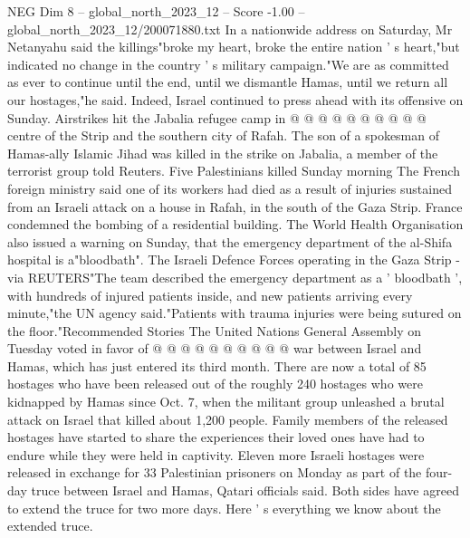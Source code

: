 \begin{textsample}{NEG Dim 8 – global\_north\_2023\_12 – Score -1.00 – global\_north\_2023\_12/200071880.txt}
In a nationwide address on Saturday, Mr Netanyahu said the killings"broke my heart, broke the entire nation ' s heart,"but indicated no change in the country ' s military campaign."We are as committed as ever to continue until the end, until we dismantle Hamas, until we return all our hostages,"he said.
Indeed, Israel continued to press ahead with its offensive on Sunday.
Airstrikes hit the Jabalia refugee camp in @ @ @ @ @ @ @ @ @ @ centre of the Strip and the southern city of Rafah.
The son of a spokesman of Hamas-ally Islamic Jihad was killed in the strike on Jabalia, a member of the terrorist group told Reuters.
Five Palestinians killed Sunday morning The French foreign ministry said one of its workers had died as a result of injuries sustained from an Israeli attack on a house in Rafah, in the south of the Gaza Strip.
France condemned the bombing of a residential building.
The World Health Organisation also issued a warning on Sunday, that the emergency department of the al-Shifa hospital is a"bloodbath".
The Israeli Defence Forces operating in the Gaza Strip - via REUTERS"The team described the emergency department as a ' bloodbath ', with hundreds of injured patients inside, and new patients arriving every minute,"the UN agency said."Patients with trauma injuries were being sutured on the floor."Recommended Stories The United Nations General Assembly on Tuesday voted in favor of @ @ @ @ @ @ @ @ @ @ war between Israel and Hamas, which has just entered its third month.
There are now a total of 85 hostages who have been released out of the roughly 240 hostages who were kidnapped by Hamas since Oct. 7, when the militant group unleashed a brutal attack on Israel that killed about 1,200 people.
Family members of the released hostages have started to share the experiences their loved ones have had to endure while they were held in captivity.
Eleven more Israeli hostages were released in exchange for 33 Palestinian prisoners on Monday as part of the four-day truce between Israel and Hamas, Qatari officials said.
Both sides have agreed to extend the truce for two more days.
Here ' s everything we know about the extended truce.

\end{textsample}
